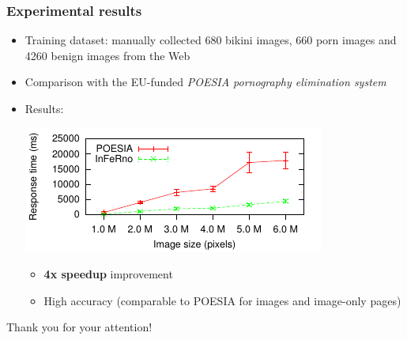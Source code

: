 \documentclass{beamer}
\begin{document}
\begin{frame}
\frametitle{Experimental results}
	\begin{itemize}

		\item Training dataset: manually collected 680 bikini images, 
		      660 porn images and 4260 benign images from the Web

		\item Comparison with the EU-funded {\em POESIA pornography elimination system}

		\item Results:
	          \begin{center}
		             \includegraphics[scale=1.3]{images/scatter-p-t-all-bars.pdf}
	          \end{center}
			  \begin{itemize}
	                \item \textbf{4x speedup} improvement 
                    \item High accuracy (comparable to POESIA for images and image-only pages)
	          \end{itemize}
	\end{itemize}
\end{frame}

\begin{frame}
	\centerline{Thank you for your attention! \smiley}
\end{frame}
\end{document}

